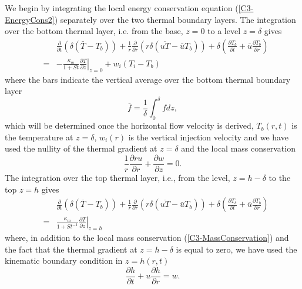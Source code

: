 We  begin  by  integrating  the  local  energy  conservation  equation
(\ref{C3-EnergyCons2})  separately  over   the  two  thermal  boundary
layers.  The integration over the  bottom thermal layer, i.e. from the
base, $z=0$ to a level $z = \delta$ gives
\begin{eqnarray}
  &&\frac{\partial}{\partial t}\left( \delta( \bar{T}-T_b)\right)+\frac{1}{r}\frac{\partial}{\partial r} \left( r\delta(\overline{uT}-\bar{u}T_b)\right) + \delta\left( \frac{\partial T_b}{\partial t}+ \overline{u}\frac{\partial T_b}{\partial r}\right)\nonumber\\
  &=&-\frac{\kappa_m}{1+St}\left. \frac{\partial T}{\partial z}\right|_{z=0}+w_{i}(T_{i}-T_b)
      \label{C3-Local1}
\end{eqnarray}
where the bars  indicate the vertical average over  the bottom thermal
boundary layer
\begin{equation}
  \overline{f} = \frac{1}{\delta}\int_0^{\delta}f dz\nonumber,
\end{equation}
which will be determined once the horizontal flow velocity is derived,
$T_b(r,t)$  is  the  temperature  at  $z=\delta$,  $w_{i}(r)$  is  the
vertical  injection velocity  and  we  have used  the  nullity of  the
thermal gradient at $z=\delta$ and the local mass conservation
\begin{equation}
  \frac{1}{r}\frac{\partial ru}{\partial r} +\frac{\partial w}{\partial z}=0.
  \label{C3-MassConservation}
\end{equation}
The  integration over  the top  thermal layer,  i.e., from  the level,
$z=h-\delta$ to the top $z=h$ gives
\begin{eqnarray}
  &&\frac{\partial}{\partial t}\left( \delta( \bar{T}-T_b)\right)+\frac{1}{r}\frac{\partial}{\partial r} \left( r\delta(\overline{uT}-\bar{u}T_b)\right) + \delta\left(\frac{\partial T_b}{\partial t}+ \overline{u}\frac{\partial T_b}{\partial r}\right)\nonumber\\
  &=&\frac{\kappa_m}{1+St^{-1}}\left. \frac{\partial T}{\partial z}\right|_{z=h}
      \label{C3-Local2}
\end{eqnarray}
where,    in    addition    to    the    local    mass    conservation
(\ref{C3-MassConservation}) and the fact  that the thermal gradient at
$z=h-\delta$ is  equal to  zero, we have  used the  kinematic boundary
condition in $z=h(r,t)$
\begin{equation}
  \frac{\partial h}{\partial t} +u\frac{\partial h}{\partial
    r} = w.
\end{equation}


